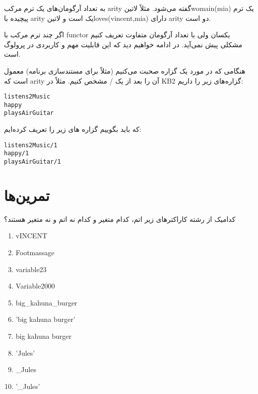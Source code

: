 به تعداد آرگومان‌های یک ترم مرکب arity گفته می‌شود. مثلاً ‌لاتین{womain(mia)} یک ترم پیچیده با arity یک است و ‌لاتین{loves(vincent,mia)} دارای arity دو است.

اگر چند ترم مرکب با functor یکسان ولی با تعداد آرگومان متفاوت تعریف کنیم مشکلی پیش نمی‌آید. در ادامه خواهیم دید که این قابلیت مهم و کاربردی در پرولوگ است.

هنگامی که در مورد یک گزاره صحبت می‌کنیم (مثلاً برای مستندسازی برنامه) معمول است که arity آن را بعد از یک / مشخص کنیم. مثلاً در KB2 گزاره‌های زیر را داریم:

\begin{latin}
\begin{lstlisting}
listens2Music 
happy 
playsAirGuitar
\end{lstlisting}
\end{latin}

که باید بگوییم گزاره های زیر را تعریف کرده‌ایم:

\begin{latin}
\begin{lstlisting}
listens2Music/1 
happy/1
playsAirGuitar/1
\end{lstlisting}
\end{latin}

\clearpage

\section{تمرین‌ها}
\begin{exercise}
کدامیک از رشته‌ کاراکترهای زیر اتم، کدام‌ متغیر و کدام نه اتم و نه متغیر هستند؟\\
\begin{latin}
\begin{enumerate}
\item vINCENT
\item Footmassage
\item variable23
\item Variable2000
\item big\_kahuna\_burger
\item 'big  kahuna  burger'
\item big  kahuna  burger
\item 'Jules'
\item \_Jules
\item '\_Jules'
\end{enumerate}
\end{latin}
\end{exercise}


